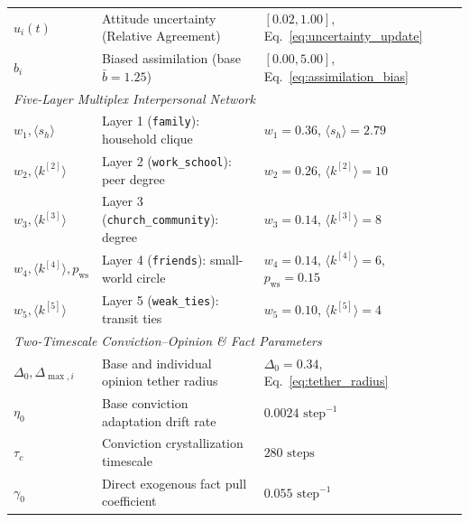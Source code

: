 \documentclass[11pt,a4paper]{article}
\begin{document}
\begin{table}[htbp]
\begin{tabular}{lp{5.1cm}p{3.6cm}p{3.8cm}}
$u_i(t)$ & Attitude uncertainty (Relative Agreement) & $[0.02, 1.00]$, Eq.~\eqref{eq:uncertainty_update} & \cite{deffuant2002how} \\
$b_i$ & Biased assimilation (base $\bar{b}=1.25$) & $[0.00, 5.00]$, Eq.~\eqref{eq:assimilation_bias} & \cite{lord1979biased, dandekar2013biased} \\
\midrule
\multicolumn{4}{l}{\textit{Five-Layer Multiplex Interpersonal Network}} \\
$w_1, \langle s_h \rangle$ & Layer 1 (\texttt{family}): household clique & $w_1 = 0.36$, $\langle s_h \rangle = 2.79$ & \cite{ibge2022censo} \\
$w_2, \langle k^{[2]} \rangle$ & Layer 2 (\texttt{work\_school}): peer degree & $w_2 = 0.26$, $\langle k^{[2]} \rangle = 10$ & \cite{inep2023censo, mte2023rais} \\
$w_3, \langle k^{[3]} \rangle$ & Layer 3 (\texttt{church\_community}): degree & $w_3 = 0.14$, $\langle k^{[3]} \rangle = 8$ & \cite{mcpherson2001birds} \\
$w_4, \langle k^{[4]} \rangle, p_{\mathrm{ws}}$ & Layer 4 (\texttt{friends}): small-world circle & $w_4 = 0.14$, $\langle k^{[4]} \rangle = 6$, $p_{\mathrm{ws}}=0.15$ & \cite{watts1998collective} \\
$w_5, \langle k^{[5]} \rangle$ & Layer 5 (\texttt{weak\_ties}): transit ties & $w_5 = 0.10$, $\langle k^{[5]} \rangle = 4$ & \cite{granovetter1973strength, ibge2022censo} \\
\midrule
\multicolumn{4}{l}{\textit{Two-Timescale Conviction--Opinion \& Fact Parameters}} \\
$\Delta_0, \Delta_{\max, i}$ & Base and individual opinion tether radius & $\Delta_0 = 0.34$, Eq.~\eqref{eq:tether_radius} & \cite{sherif1961social, howe2017attitude} \\
$\eta_0$ & Base conviction adaptation drift rate & $0.0024 \text{ step}^{-1}$ & \cite{kiley2020measuring} \\
$\tau_c$ & Conviction crystallization timescale & $280 \text{ steps}$ & \cite{alwin1991aging} \\
$\gamma_0$ & Direct exogenous fact pull coefficient & $0.055 \text{ step}^{-1}$ & \cite{mullainathan2005market, zaller1992nature} \\
\bottomrule
\end{tabular}
\end{table}


\end{document}
